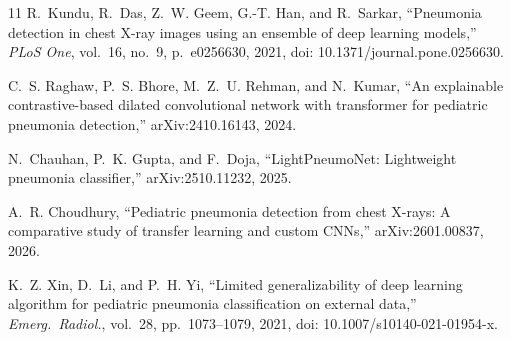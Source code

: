 \documentclass[11pt,a4paper]{article}
\begin{document}
\begin{thebibliography}{11}
R.~Kundu, R.~Das, Z.~W. Geem, G.-T. Han, and R.~Sarkar, ``Pneumonia detection in chest X-ray images using an ensemble of deep learning models,'' \textit{PLoS One}, vol.~16, no.~9, p.~e0256630, 2021, doi: 10.1371/journal.pone.0256630.

C.~S. Raghaw, P.~S. Bhore, M.~Z.~U. Rehman, and N.~Kumar, ``An explainable contrastive-based dilated convolutional network with transformer for pediatric pneumonia detection,'' arXiv:2410.16143, 2024.

N.~Chauhan, P.~K. Gupta, and F.~Doja, ``LightPneumoNet: Lightweight pneumonia classifier,'' arXiv:2510.11232, 2025.

A.~R. Choudhury, ``Pediatric pneumonia detection from chest X-rays: A comparative study of transfer learning and custom CNNs,'' arXiv:2601.00837, 2026.

K.~Z. Xin, D.~Li, and P.~H. Yi, ``Limited generalizability of deep learning algorithm for pediatric pneumonia classification on external data,'' \textit{Emerg.\ Radiol.}, vol.~28, pp.~1073--1079, 2021, doi: 10.1007/s10140-021-01954-x.

\end{thebibliography}
\end{document}
